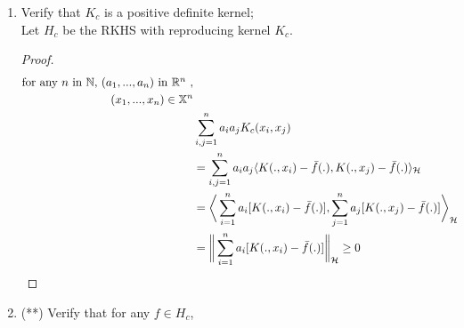 \documentclass{article}
\begin{document}
\begin{enumerate}
    


    \item Verify that $K_c$ is a positive definite kernel; \\ 
          Let $H_c$ be the RKHS with reproducing kernel $K_c$. 

        \begin{proof}
        \begin{equation}
            \begin{aligned} 
                \mbox{for any $n$ in $\mathbb{N}$, $(a_1, ..., a_n)$ in $\mathbb{R}^n$ ,} \notag \\
                (x_1, ..., x_n) \in \mathbb{X}^n \\
                &\sum_{i,j=1}^{n} a_i a_j K_c(x_i, x_j)  \\
                &= \sum_{i,j=1}^{n} a_i a_j \langle K(.,x_i) - \bar{f}(.), K(.,x_j) - \bar{f}(.)\rangle_{\mathcal{H}} \\
                &= \bigg \langle \sum_{i=1}^{n} a_i [K(.,x_i) - \bar{f}(.)], 
                    \sum_{j=1}^{n} a_j [K(.,x_j) - \bar{f}(.)] \bigg \rangle_{\mathcal{H}} \\
                & = \bigg \| \sum_{i=1}^{n} a_i [K(.,x_i) - \bar{f}(.)] \bigg \|_{\mathcal{H}} \ge 0
            \end{aligned}
        \end{equation} 
        \end{proof}
    


    \item (**) Verify that for any $f \in H_c$, 
        

\end{enumerate}
\end{document}
